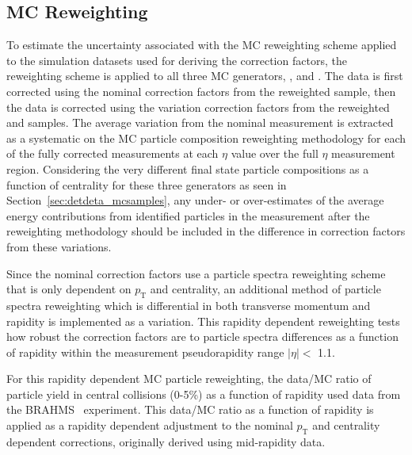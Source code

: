 \subsection{MC Reweighting}
To estimate the uncertainty associated with the MC reweighting scheme applied to the simulation datasets used for deriving the \detdeta correction factors, the reweighting scheme is applied to all three MC generators, \epos, \ampt and \hijing.
The data is first corrected using the nominal correction factors from the reweighted \epos sample, then the data is corrected using the variation correction factors from the reweighted \hijing and \ampt samples.
The average variation from the nominal measurement is extracted as a systematic on the MC particle composition reweighting methodology for each of the fully corrected \detdeta measurements at each $\eta$ value over the full $\eta$ measurement region. 
Considering the very different final state particle compositions as a function of centrality for these three generators as seen in Section~\ref{sec:detdeta_mcsamples}, any under- or over-estimates of the average energy contributions from identified particles in the \detdeta measurement after the reweighting methodology should be included in the difference in correction factors from these variations. 

Since the nominal correction factors use a particle spectra reweighting scheme that is only dependent on $p_{\text{T}}$ and centrality, an additional method of particle spectra reweighting which is differential in both transverse momentum and rapidity is implemented as a variation.
This rapidity dependent reweighting tests how robust the \detdeta correction factors are to particle spectra differences as a function of rapidity within the measurement pseudorapidity range $|\eta| <$ 1.1. 

For this rapidity dependent MC particle reweighting, the data/MC ratio of particle yield in central collisions (0-5\%) as a function of rapidity used data from the BRAHMS~\cite{Brahms_pi_spectra,Brahms_p_spectra} experiment. 
This data/MC ratio as a function of rapidity is applied as a rapidity dependent adjustment to the nominal $p_{\text{T}}$ and centrality dependent corrections, originally derived using mid-rapidity data.

